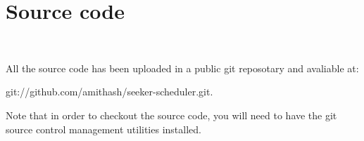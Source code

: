 \chapter{Source code}~\label{app:source}

All the source code has been uploaded in a public git reposotary and avaliable
at:

git://github.com/amithash/seeker-scheduler.git. 


Note that in order to checkout the source code, you will need to have the git source control management
utilities installed.

